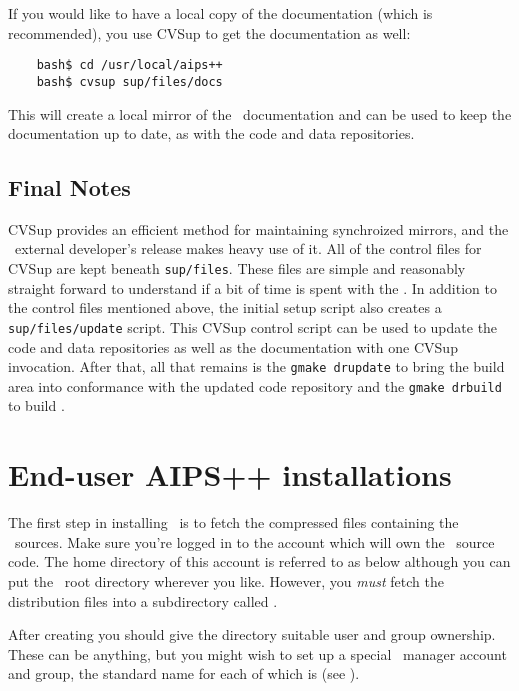 If you would like to have a local copy of the documentation (which is recommended),
you use CVSup to get the documentation as well:
\begin{verbatim}
    bash$ cd /usr/local/aips++
    bash$ cvsup sup/files/docs
\end{verbatim}
This will create a local mirror of the \aipspp\ documentation and can be
used to keep the documentation up to date, as with the code and data
repositories.

\subsection{Final Notes}

CVSup provides an efficient method for maintaining synchroized mirrors, and
the \aipspp\ external developer's release makes heavy use of it. All of the
control files for CVSup are kept beneath \verb+sup/files+. These files are
simple and reasonably straight forward to understand if a bit of time is
spent with the
.
In addition to the control files mentioned above, the initial setup script
also creates a \verb+sup/files/update+ script. This CVSup control script
can be used to update the code and data repositories as well as the documentation
with one CVSup invocation. After that, all that remains is the \verb+gmake drupdate+
to bring the build area into conformance with the updated code repository and
the \verb+gmake drbuild+ to build \aipspp.


\section{End-user AIPS++ installations}
\label{End-user installation}

The first step in installing \aipspp\ is to fetch the compressed 
files containing the \aipspp\ sources.  Make sure you're logged in to the
account which will own the \aipspp\ source code.  The home directory of this
account is referred to as  below although you can put the
\aipspp\ root directory wherever you like.  However, you {\em must} fetch the
distribution files into a subdirectory called .

After creating  you should give the directory suitable user and
group ownership.  These can be anything, but you might wish to set up a
special \aipspp\ manager account and group, the standard name for each of
which is  (see ).

